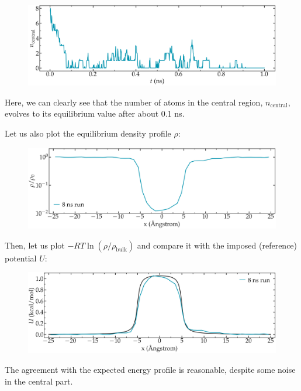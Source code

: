 \begin{figure}
\includegraphics[width=\linewidth]{tutorials/level3/free-energy-calculation/density_evolution-light.png}
\end{figure}

Here, we can clearly see that the number of atoms in the
central region, $n_\mathrm{central}$, evolves to its equilibrium value
after about 0.1 ns.

Let us also plot the equilibrium density profile $\rho$:

\begin{figure}
\includegraphics[width=\linewidth]{tutorials/level3/free-energy-calculation/density_profile-light.png}
\end{figure}

Then, let us plot $-R T \ln(\rho/\rho_\mathrm{bulk})$ and compare it
with the imposed (reference) potential $U$:

\begin{figure}
\includegraphics[width=\linewidth]{tutorials/level3/free-energy-calculation/freesampling-potential-light.png}
\end{figure}

The agreement with the expected energy profile is reasonable,
despite some noise in the central part. 

